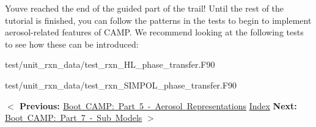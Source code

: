 You\textquotesingle{}ve reached the end of the guided part of the trail! Until the rest of the tutorial is finished, you can follow the patterns in the tests to begin to implement aerosol-\/related features of CAMP. We recommend looking at the following tests to see how these can be introduced\+:


\begin{DoxyItemize}
\item {\ttfamily test/unit\+\_\+rxn\+\_\+data/test\+\_\+rxn\+\_\+\+HL\+\_\+phase\+\_\+transfer.\+F90}
\item {\ttfamily test/unit\+\_\+rxn\+\_\+data/test\+\_\+rxn\+\_\+\+SIMPOL\+\_\+phase\+\_\+transfer.\+F90}
\end{DoxyItemize}

 {\bfseries{ $<$ Previous\+: }} \mbox{\hyperlink{camp_tutorial_part_5}{Boot CAMP\+: Part 5 -\/ Aerosol Representations}}  \mbox{\hyperlink{camp_tutorial}{Index}}  {\bfseries{ Next\+: }} \mbox{\hyperlink{camp_tutorial_part_7}{Boot CAMP\+: Part 7 -\/ Sub Models}} {\bfseries{ $>$ }} 